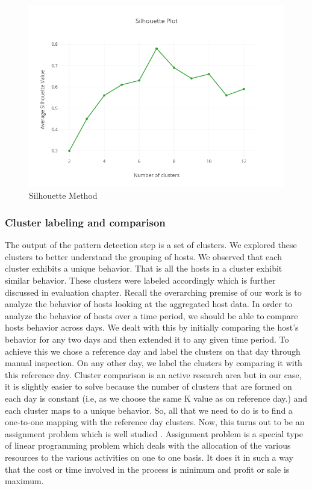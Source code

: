  \begin{figure}[t]
 	\centerline{\includegraphics[scale = 0.6]{silhouette.png}}
 	\caption{Silhouette Method}%
 \end{figure}
 
\subsubsection{Cluster labeling and comparison}  \label{cluster_labeling}

The output of the pattern detection step is a set of clusters. We explored these clusters to better understand the grouping of hosts. We observed that each cluster exhibits a unique behavior. That is all the hosts in a cluster exhibit similar behavior. These clusters were labeled accordingly which is further discussed in evaluation chapter.
Recall the overarching premise of our work is to analyze the behavior of hosts looking at the aggregated host data. In order to analyze the behavior of hosts over a time period, we should be able to compare hosts behavior across days. We dealt with this by initially comparing the host's behavior for any two days and then extended it to any given time period. To achieve this we chose a reference day and label the clusters on that day through manual inspection. On any other day, we label the clusters by comparing it with this reference day. Cluster comparison is an active research area but in our case, it is slightly easier to solve because the number of clusters that are formed on each day is constant (i.e, as we choose the same K value as on reference day.) and each cluster maps to a unique behavior. So, all that we need to do is to find a one-to-one mapping with the reference day clusters. 
Now, this turns out to be an assignment problem which is well studied \cite{kuhn1955hungarian}. Assignment problem is a special type of linear programming problem which deals with the allocation of the various resources to the various activities on one to one basis. It does it in such a way that the cost or time involved in the process is minimum and profit or sale is maximum. 


